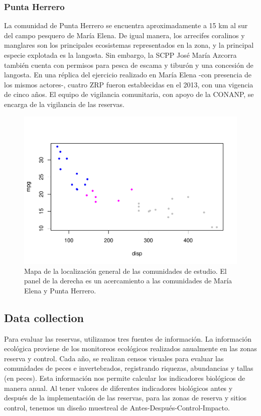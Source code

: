 \documentclass{frontiersSCNS}
\begin{document}
\subsubsection{Punta Herrero}\label{punta-herrero}

La comunidad de Punta Herrero se encuentra aproximadamente a 15 km al
sur del campo pesquero de María Elena. De igual manera, los arrecifes
coralinos y manglares son los principales ecosistemas representados en
la zona, y la principal especie explotada es la langosta. Sin embargo,
la SCPP José María Azcorra también cuenta con permisos para pesca de
escama y tiburón y una concesión de langosta. En una réplica del
ejercicio realizado en María Elena -con presencia de los mismos
actores-, cuatro ZRP fueron establecidas en el 2013, con una vigencia de
cinco años. El equipo de vigilancia comunitaria, con apoyo de la CONANP,
se encarga de la vigilancia de las reservas.

\begin{figure}
\centering
\includegraphics{Villasenor-Derbez_files/figure-latex/unnamed-chunk-1-1.pdf}
\caption{\label{fig:unnamed-chunk-1}\label{fig:map}Mapa de la localización
general de las comunidades de estudio. El panel de la derecha es un
acercamiento a las comunidades de María Elena y Punta Herrero.}
\end{figure}

\subsection{Data collection}\label{data-collection}

Para evaluar las reservas, utilizamos tres fuentes de información. La
información ecológica proviene de los monitoreos ecológicos realizados
anualmente en las zonas reserva y control. Cada año, se realizan censos
visuales para evaluar las comunidades de peces e invertebrados,
registrando riquezas, abundancias y tallas (en peces). Esta información
nos permite calcular los indicadores biológicos de manera anual. Al
tener valores de diferentes indicadores biológicos antes y después de la
implementación de las reservas, para las zonas de reserva y sitios
control, tenemos un diseño muestreal de Antes-Después-Control-Impacto.
\end{document}
